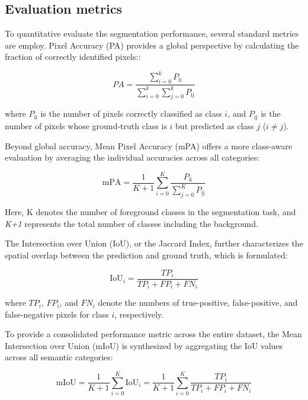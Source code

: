 \documentclass[
]{article}
\begin{document}
\hypertarget{evaluation-metrics}{%
\subsection{Evaluation metrics}\label{evaluation-metrics}}

To quantitative evaluate the segmentation performance, several standard
metrics are employ. Pixel Accuracy (PA) provides a global perspective by
calculating the fraction of correctly identified pixels::

\begin{equation}
PA = \frac{\sum_{i = 0}^{k}P_{\text{ii}}}{\sum_{i = 0}^{k}{\sum_{j = 0}^{k}P_{\text{ij}}}}
\tag{2}
\end{equation}

where \(P_{\text{ii}}\) is the number of pixels correctly classified as
class \(i\), and \(P_{\text{ij}}\) is the number of pixels whose
ground-truth class is \(i\) but predicted as class \(j\) (\(i \neq j\)).

Beyond global accuracy, Mean Pixel Accuracy (mPA) offers a more
class-aware evaluation by averaging the individual accuracies across all
categories:

\begin{equation}
\text{mPA} = \frac{1}{K + 1}\sum_{i = 0}^{K}\frac{P_{\text{ii}}}{\sum_{j = 0}^{K} P_{\text{ij}}}
\tag{3}
\end{equation}

Here, K denotes the number of foreground classes in the segmentation
task, and \emph{K+1} represents the total number of classes including
the background.

The Intersection over Union (IoU), or the Jaccard Index, further
characterizes the spatial overlap between the prediction and ground
truth, which is formulated:

\begin{equation}
\text{IoU}_{i} = \frac{TP_{i}}{TP_{i} + FP_{i} + FN_{i}}
\tag{4}
\end{equation}

where \(TP_{i}\), \(FP_{i}\), and \(FN_{i}\) denote the numbers of
true-positive, false-positive, and false-negative pixels for class
\(i\), respectively.

To provide a consolidated performance metric across the entire dataset,
the Mean Intersection over Union (mIoU) is synthesized by aggregating
the IoU values across all semantic categories:

\begin{equation}
\text{mIoU} = \frac{1}{K + 1}\sum_{i = 0}^{K}\text{IoU}_{i}
= \frac{1}{K + 1}\sum_{i = 0}^{K}\frac{TP_{i}}{TP_{i} + FP_{i} + FN_{i}}
\tag{5}
\end{equation}
\end{document}
